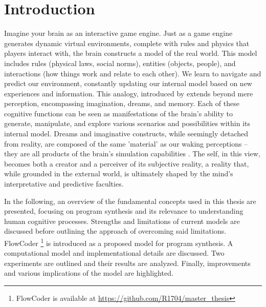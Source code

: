 \section{Introduction}
Imagine your brain as an interactive game engine. Just as a game engine generates dynamic virtual environments, complete with rules and physics that players interact with, the brain constructs a model of the real world. This model includes rules (physical laws, social norms), entities (objects, people), and interactions (how things work and relate to each other). We learn to navigate and predict our environment, constantly updating our internal model based on new experiences and information.
This analogy, introduced by \citet{ullmanMindGamesGame2017} extends beyond mere perception, encompassing imagination, dreams, and memory. Each of these cognitive functions can be seen as manifestations of the brain's ability to generate, manipulate, and explore various scenarios and possibilities within its internal model. Dreams and imaginative constructs, while seemingly detached from reality, are composed of the same 'material' as our waking perceptions – they are all products of the brain's simulation capabilities \cite{pearsonHumanImaginationCognitive2019}.
The self, in this view, becomes both a creator and a perceiver of its subjective reality, a reality that, while grounded in the external world, is ultimately shaped by the mind's interpretative and predictive faculties.

In the following, an overview of the fundamental concepts used in this thesis are presented, focusing on program synthesis and its relevance to understanding human cognitive processes. Strengths and limitations of current models are discussed before outlining the approach of overcoming said limitations. FlowCoder \footnote{FlowCoder is available at \url{https://github.com/R1704/master_thesis}} is introduced as a proposed model for program synthesis. A computational model and implementational details are discussed. Two experiments are outlined and their results are analyzed. Finally, improvements and various implications of the model are highlighted.

